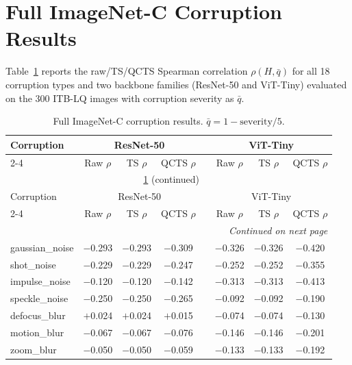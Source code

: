 \documentclass{bmvc2k}
\begin{document}
\section{Full ImageNet-C Corruption Results}
\label{app:imagenetc}

Table~\ref{tab:imagenetc_full} reports the raw/TS/QCTS Spearman correlation $\rho(H, \bar q)$ for all 18 corruption types and two backbone families (ResNet-50 and ViT-Tiny) evaluated on the 300 ITB-LQ images with corruption severity as $\bar q$.

\begin{longtable}{lccccccc}
\caption{Full ImageNet-C corruption results. $\bar q = 1 - \text{severity}/5$.}
\label{tab:imagenetc_full} \\
\toprule
Corruption & \multicolumn{3}{c}{ResNet-50} & & \multicolumn{3}{c}{ViT-Tiny} \\
\cmidrule{2-4} \cmidrule{6-8}
& Raw $\rho$ & TS $\rho$ & QCTS $\rho$ & & Raw $\rho$ & TS $\rho$ & QCTS $\rho$ \\
\midrule
\endfirsthead
\multicolumn{8}{c}{\tablename\ \ref{tab:imagenetc_full} (continued)} \\
\toprule
Corruption & \multicolumn{3}{c}{ResNet-50} & & \multicolumn{3}{c}{ViT-Tiny} \\
\cmidrule{2-4} \cmidrule{6-8}
& Raw $\rho$ & TS $\rho$ & QCTS $\rho$ & & Raw $\rho$ & TS $\rho$ & QCTS $\rho$ \\
\midrule
\endhead
\midrule
\multicolumn{8}{r}{\textit{Continued on next page}} \\
\endfoot
\bottomrule
\endlastfoot
gaussian\_noise    & $-$0.293 & $-$0.293 & $-$0.309 & & $-$0.326 & $-$0.326 & $-$0.420 \\
shot\_noise        & $-$0.229 & $-$0.229 & $-$0.247 & & $-$0.252 & $-$0.252 & $-$0.355 \\
impulse\_noise     & $-$0.120 & $-$0.120 & $-$0.142 & & $-$0.313 & $-$0.313 & $-$0.413 \\
speckle\_noise     & $-$0.250 & $-$0.250 & $-$0.265 & & $-$0.092 & $-$0.092 & $-$0.190 \\
defocus\_blur      & $+$0.024 & $+$0.024 & $+$0.015 & & $-$0.074 & $-$0.074 & $-$0.130 \\
motion\_blur       & $-$0.067 & $-$0.067 & $-$0.076 & & $-$0.146 & $-$0.146 & $-$0.201 \\
zoom\_blur         & $-$0.050 & $-$0.050 & $-$0.059 & & $-$0.133 & $-$0.133 & $-$0.192 \\

\end{longtable}
\end{document}
